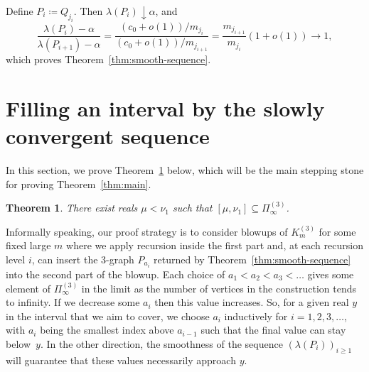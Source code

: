 \documentclass[10pt]{article}
\numberwithin{equation}{section}
\newtheorem{theorem}{Theorem}[section]
\begin{document}
Define $P_i\coloneqq Q_{j_i}$. Then $\lambda(P_i)\downarrow \alpha$, and
\[
        \frac{\lambda(P_i)-\alpha}{\lambda(P_{i+1})-\alpha} = \frac{(c_0+o(1))/m_{j_i}}{(c_0+o(1))/m_{j_{i+1}}} = \frac{m_{j_{i+1}}}{m_{j_i}}(1+o(1))\to 1,
\]
which proves Theorem~\ref{thm:smooth-sequence}.

\section{Filling an interval by the slowly convergent sequence}
\label{sec:recursive-interval}
%
In this section, we prove Theorem~\ref{thm:interval-3} below, which will be the main stepping stone for proving Theorem~\ref{thm:main}.


\begin{theorem}\label{thm:interval-3} 
There exist reals $\mu< \nu_1$ such that $[\mu,\nu_1]\subseteq \Pi^{(3)}_\infty$.
\end{theorem}


 



Informally speaking, our proof strategy is to consider blowups of $K_m^{(3)}$ for some fixed large $m$ where we apply recursion inside the first part and, at each recursion level $i$, can insert the $3$-graph $P_{a_i}$ returned by Theorem~\ref{thm:smooth-sequence} into the second part of the blowup. Each choice of $a_1<a_2<a_3<\dots$ gives some element of $\Pi^{(3)}_\infty$ in the limit as the number of vertices in the construction tends to infinity. If we decrease some $a_i$ then this value increases. So, for a given real $y$ in the interval that we aim to cover, we choose $a_i$ inductively for $i=1,2,3,\dots$, with $a_{i}$ being the smallest index above $a_{i-1}$ such that the final value can stay below~$y$. In the other direction, the smoothness of the sequence $(\lambda(P_i))_{i\ge 1}$ will guarantee that these values necessarily approach $y$.
\end{document}
